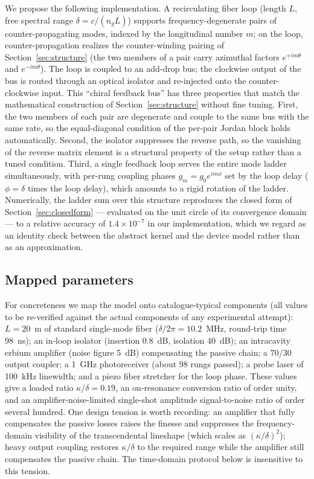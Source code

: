 \documentclass[11pt,a4paper]{article}
\begin{document}
We propose the following implementation. A recirculating fiber loop (length
$L$, free spectral range $\delta = c / (n_g L)$) supports frequency-degenerate
pairs of counter-propagating modes, indexed by the longitudinal number $m$; on
the loop, counter-propagation realizes the counter-winding pairing of
Section~\ref{sec:structure} (the two members of a pair carry azimuthal factors
$e^{+i m \theta}$ and $e^{-i m \theta}$). The loop is coupled to an add-drop
bus; the clockwise output of the bus is routed through an optical isolator and
re-injected onto the counter-clockwise input. This ``chiral feedback bus'' has
three properties that match the mathematical construction of
Section~\ref{sec:structure} without fine tuning. First, the two members of each
pair are degenerate and couple to the same bus with the same rate, so the
equal-diagonal condition of the per-pair Jordan block holds automatically.
Second, the isolator suppresses the reverse path, so the vanishing of the
reverse matrix element is a structural property of the setup rather than a
tuned condition. Third, a single feedback loop serves the entire mode ladder
simultaneously, with per-rung coupling phases $g_m = g_0 e^{i m \phi}$ set by
the loop delay ($\phi = \delta$ times the loop delay), which amounts to a rigid
rotation of the ladder. Numerically, the ladder sum over this structure
reproduces the closed form of Section~\ref{sec:closedform} --- evaluated on the
unit circle of its convergence domain --- to a relative accuracy of
$1.4\times 10^{-7}$ in our implementation, which we regard as an identity check
between the abstract kernel and the device model rather than as an
approximation.

\subsection{Mapped parameters}

For concreteness we map the model onto catalogue-typical components (all values
to be re-verified against the actual components of any experimental attempt):
$L = 20$~m of standard single-mode fiber ($\delta / 2\pi = 10.2$~MHz,
round-trip time 98~ns); an in-loop isolator (insertion 0.8~dB, isolation
40~dB); an intracavity erbium amplifier (noise figure 5~dB) compensating the
passive chain; a 70/30 output coupler; a 1~GHz photoreceiver (about 98 rungs
passed); a probe laser of 100~kHz linewidth; and a piezo fiber stretcher for
the loop phase. These values give a loaded ratio $\kappa/\delta = 0.19$, an
on-resonance conversion ratio of order unity, and an amplifier-noise-limited
single-shot amplitude signal-to-noise ratio of order several hundred. One
design tension is worth recording: an amplifier that fully compensates the
passive losses raises the finesse and suppresses the frequency-domain
visibility of the transcendental lineshape (which scales as
$(\kappa/\delta)^2$); heavy output coupling restores $\kappa/\delta$ to the
required range while the amplifier still compensates the passive chain. The
time-domain protocol below is insensitive to this tension.
\end{document}
